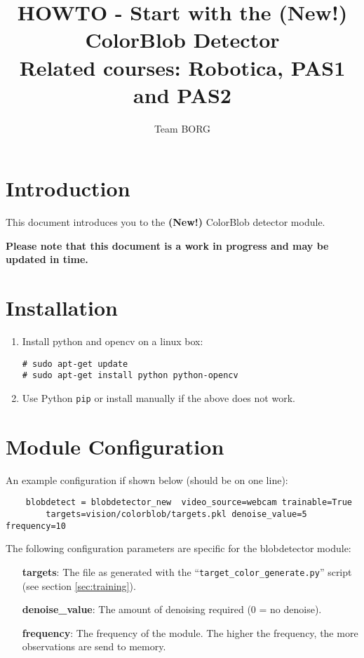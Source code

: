 \documentclass[a4paper, 10pt]{article}
\title{HOWTO - Start with the (New!) ColorBlob Detector \\ \small{Related courses: Robotica, PAS1 and PAS2}}
\author{Team BORG}
\begin{document}
\maketitle

\tableofcontents

\section{Introduction}

This document introduces you to the \textbf{(New!)} ColorBlob detector module.

\textbf{Please note that this document is a work in progress and may be updated in time.}

\section{Installation}

\begin{enumerate}
    \item Install python and opencv on a linux box:
\begin{lstlisting}
# sudo apt-get update
# sudo apt-get install python python-opencv 
\end{lstlisting}
    \item Use Python \lstinline{pip} or install manually if the above does not work.
\end{enumerate}

\section{Module Configuration}

An example configuration if shown below (should be on one line):
\begin{lstlisting}
    blobdetect = blobdetector_new  video_source=webcam trainable=True 
        targets=vision/colorblob/targets.pkl denoise_value=5 frequency=10
\end{lstlisting}

The following configuration parameters are specific for the blobdetector module:
\begin{enumerate}
    \item[\textbf{targets}:] The file as generated with the ``\lstinline{target_color_generate.py}'' script (see section \ref{sec:training}).
    \item[\textbf{denoise\_value}:] The amount of denoising required (0 = no denoise).
    \item[\textbf{frequency}:] The frequency of the module. The higher the frequency, the more observations are send to memory.
\end{enumerate}
\end{document}
